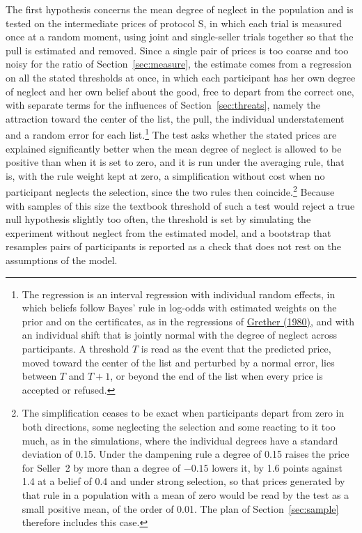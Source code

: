 \documentclass[11pt,a4paper]{article}
\newcommand{\cy}[2]{\hyperlink{cite.#1}{\textcolor{citecolor}{#2}}}
\newcommand{\prot}[1]{\textsf{#1}}
\begin{document}
The first hypothesis concerns the mean degree of neglect in the population and is tested on the intermediate prices of protocol \prot{S}, in which each trial is measured once at a random moment, using joint and single-seller trials together so that the pull is estimated and removed. Since a single pair of prices is too coarse and too noisy for the ratio of Section~\ref{sec:measure}, the estimate comes from a regression on all the stated thresholds at once, in which each participant has her own degree of neglect and her own belief about the good, free to depart from the correct one, with separate terms for the influences of Section~\ref{sec:threats}, namely the attraction toward the center of the list, the pull, the individual understatement and a random error for each list.\footnote{The regression is an interval regression with individual random effects, in which beliefs follow Bayes' rule in log-odds with estimated weights on the prior and on the certificates, as in the regressions of \cy{grether}{Grether (1980)}, and with an individual shift that is jointly normal with the degree of neglect across participants. A threshold $T$ is read as the event that the predicted price, moved toward the center of the list and perturbed by a normal error, lies between $T$ and $T+1$, or beyond the end of the list when every price is accepted or refused.} The test asks whether the stated prices are explained significantly better when the mean degree of neglect is allowed to be positive than when it is set to zero, and it is run under the averaging rule, that is, with the rule weight kept at zero, a simplification without cost when no participant neglects the selection, since the two rules then coincide.\footnote{The simplification ceases to be exact when participants depart from zero in both directions, some neglecting the selection and some reacting to it too much, as in the simulations, where the individual degrees have a standard deviation of 0.15. Under the dampening rule a degree of 0.15 raises the price for Seller~2 by more than a degree of $-0.15$ lowers it, by 1.6 points against 1.4 at a belief of 0.4 and under strong selection, so that prices generated by that rule in a population with a mean of zero would be read by the test as a small positive mean, of the order of 0.01. The plan of Section~\ref{sec:sample} therefore includes this case.} Because with samples of this size the textbook threshold of such a test would reject a true null hypothesis slightly too often, the threshold is set by simulating the experiment without neglect from the estimated model, and a bootstrap that resamples pairs of participants is reported as a check that does not rest on the assumptions of the model.
\end{document}
